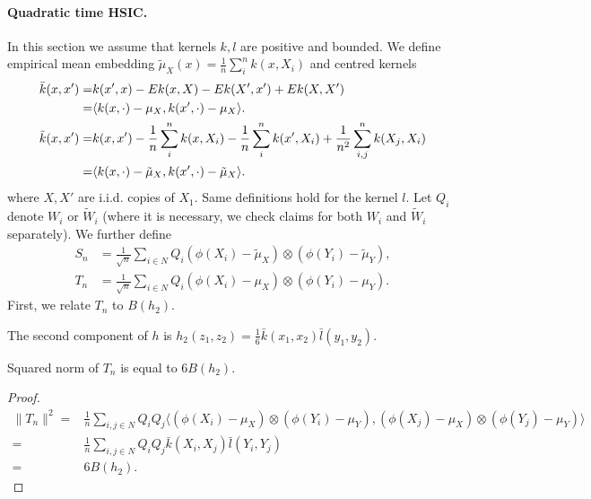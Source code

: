 \paragraph{Quadratic time HSIC.}
In this section we assume that kernels $k,l$ are positive and bounded. We define empirical mean embedding $\tilde \mu_X(x) = \frac 1 n \sum_{i}^n k(x,X_i) $ and centred kernels
\begin{equation*}
\begin{split}
\bar{k}(x,x') =& k(x',x) - E k(x,X) -E k(X',x') + E k(X,X')\\
=&\langle k(x,\cdot ) -\mu_X ,k(x',\cdot)- \mu_X\rangle. \\
 \tilde k(x,x') =& k(x,x') - \frac 1 n \sum_{i}^n k(x,X_i) - \frac 1 n \sum_{i}^n k(x',X_i) +   \frac {1} {n^2} \sum_{i,j}^n k(X_j,X_i)\\
=&\langle k(x,\cdot ) - \tilde\mu_X ,k(x',\cdot)- \tilde \mu_X\rangle. \\
\end{split}
\end{equation*}
where $X,X'$ are i.i.d. copies of $X_1$. Same definitions hold for the kernel $l$. Let $Q_i$ denote  $W_i$ or  $\tilde W_i$ (where  it is necessary, we check claims for both $W_i$ and  $\tilde W_i$ separately). We further define 
\begin{align}
\label{hsic_2}
S_n &= \frac {1} {\sqrt n}\sum_{i \in N} Q_i ( \phi(X_i) - \tilde \mu_X ) \otimes (\phi(Y_i )  - \tilde \mu_Y), \\
T_n &= \frac {1} {\sqrt n}  \sum_{i \in N} Q_i ( \phi(X_i) -  \mu_X ) \otimes(\phi(Y_i )  -  \mu_Y). 
\end{align}
First, we  relate $T_n$ to $B(h_2)$. 
\begin{statement}{ \cite[section A.2, following eq. (11)]{gretton_kernel_2008}}
\label{stm:thanks}
The second component of $h$ is $h_2(z_1,z_2) =  \frac 1 6 \bar{k}(x_1,x_2) \bar{l}(y_1,y_2).$ 
\end{statement}
\begin{lemma}
\label{lem:T_n}
 Squared norm of $T_n$  is equal to $ 6 B(h_2) $.
\end{lemma}
\begin{proof}
  \begin{align*}
 \| T_n \|^2 =  & \frac 1 n  \sum_{i,j \in N} Q_i Q_j \bigg\langle   ( \phi(X_i) -  \mu_X ) \otimes  (\phi(Y_i )  -  \mu_Y),   ( \phi(X_j) -  \mu_X ) \otimes (\phi(Y_j )  -  \mu_Y) \bigg\rangle  \\
  =& \frac 1 n \sum_{i,j \in N} Q_i Q_j \bar k(X_i,X_j)  \bar l(Y_i,Y_j)  \\
  =&6 B(h_2).
 \end{align*}
\end{proof}
